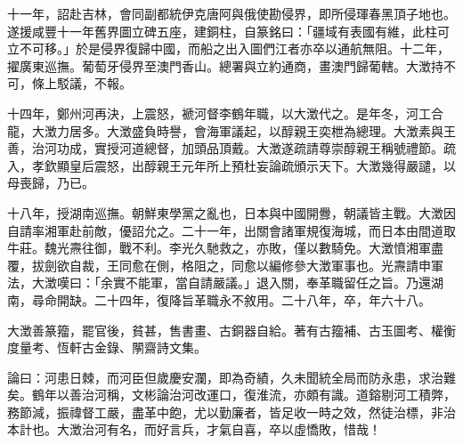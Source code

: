 \begin{pinyinscope}
十一年，詔赴吉林，會同副都統伊克唐阿與俄使勘侵界，即所侵琿春黑頂子地也。遂援咸豐十一年舊界圖立碑五座，建銅柱，自篆銘曰：「疆域有表國有維，此柱可立不可移。」於是侵界復歸中國，而船之出入圖們江者亦卒以通航無阻。十二年，擢廣東巡撫。葡萄牙侵界至澳門香山。總署與立約通商，畫澳門歸葡轄。大澂持不可，條上駁議，不報。

十四年，鄭州河再決，上震怒，褫河督李鶴年職，以大澂代之。是年冬，河工合龍，大澂力居多。大澂盛負時譽，會海軍議起，以醇親王奕枻為總理。大澂素與王善，治河功成，實授河道總督，加頭品頂戴。大澂遂疏請尊崇醇親王稱號禮節。疏入，孝欽顯皇后震怒，出醇親王元年所上預杜妄論疏頒示天下。大澂幾得嚴譴，以母喪歸，乃已。

十八年，授湖南巡撫。朝鮮東學黨之亂也，日本與中國開釁，朝議皆主戰。大澂因自請率湘軍赴前敵，優詔允之。二十一年，出關會諸軍規復海城，而日本由間道取牛莊。魏光燾往御，戰不利。李光久馳救之，亦敗，僅以數騎免。大澂憤湘軍盡覆，拔劍欲自裁，王同愈在側，格阻之，同愈以編修參大澂軍事也。光燾請申軍法，大澂嘆曰：「余實不能軍，當自請嚴議。」退入關，奉革職留任之旨。乃還湖南，尋命開缺。二十四年，復降旨革職永不敘用。二十八年，卒，年六十八。

大澂善篆籀，罷官後，貧甚，售書畫、古銅器自給。著有古籀補、古玉圖考、權衡度量考、恆軒古金錄、䦛齋詩文集。

論曰：河患日棘，而河臣但歲慶安瀾，即為奇績，久未聞統全局而防永患，求治難矣。鶴年以善治河稱，文彬論治河改運口，復淮流，亦頗有識。道鎔剔河工積弊，務節減，振禕督工嚴，盡革中飽，尤以勤廉者，皆足收一時之效，然徒治標，非治本計也。大澂治河有名，而好言兵，才氣自喜，卒以虛憍敗，惜哉！


\end{pinyinscope}